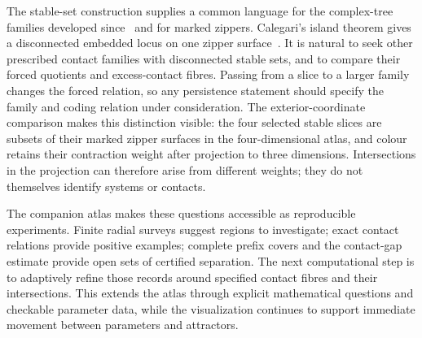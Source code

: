 The stable-set construction supplies a common language for the complex-tree
families developed since~\cite{Espigule2013,Espigule2018,Espigule2019a} and for
marked zippers. Calegari's island theorem gives a disconnected embedded locus
on one zipper surface~\cite{Calegari2026}. It is natural to seek other prescribed
contact families with disconnected stable sets, and to compare their forced
quotients and excess-contact fibres. Passing from a slice to a larger family
changes the forced relation, so any persistence statement should specify the
family and coding relation under consideration. The exterior-coordinate
comparison makes this distinction visible: the four selected stable slices
are subsets of their marked zipper surfaces in the four-dimensional atlas,
and colour retains their contraction weight after projection to three
dimensions. Intersections in the projection can therefore arise from
different weights; they do not themselves identify systems or contacts.

The companion atlas makes these questions accessible as reproducible
experiments. Finite radial surveys suggest regions to investigate; exact
contact relations provide positive examples; complete prefix covers and the
contact-gap estimate provide open sets of certified separation. The next
computational step is to adaptively refine those records around specified
contact fibres and their intersections. This extends the atlas through explicit
mathematical questions and checkable parameter data, while the visualization
continues to support immediate movement between parameters and attractors.
